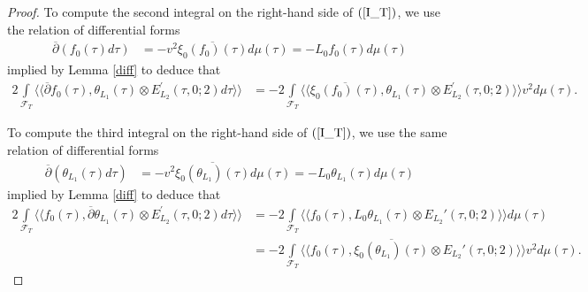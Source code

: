 \documentclass{amsart}
\theoremstyle{definition}
\begin{document}
\begin{proof}
To compute the second integral on the right-hand side of $(\ref{I_T})$, we use the relation of differential forms 
\begin{align*} \overline{\partial}(f_0(\tau) d \tau) 
&= - v^2 \overline{\xi_0(f_0)(\tau)} d \mu(\tau) = -L_0 f_0(\tau) d \mu (\tau) \end{align*}
implied by Lemma \ref{diff} to deduce that 
\begin{equation}\begin{aligned}\label{I_T2} 
 2 \int\limits_{\mathcal{F}_T} \langle \langle \overline{\partial} f_0(\tau), \theta_{L_1}(\tau) \otimes E_{L_2}^{\prime}(\tau, 0; 2) d \tau \rangle \rangle
 &= -2 \int\limits_{\mathcal{F}_T} \langle \langle \overline{\xi_0(f_0)(\tau)}, 
 \theta_{L_1}(\tau) \otimes E_{L_2}^{\prime}(\tau, 0; 2) \rangle \rangle v^2 d \mu(\tau). \end{aligned}\end{equation}

To compute the third integral on the right-hand side of $(\ref{I_T})$, we use the same relation of differential forms 
\begin{align*} \overline{\partial}(\theta_{L_1}(\tau) d \tau) &= - v^2 \overline{\xi_0(\theta_{L_1})(\tau)} d \mu(\tau) = -L_0 \theta_{L_1}(\tau) d \mu (\tau) \end{align*}
implied by Lemma \ref{diff} to deduce that 
\begin{align*} 2 \int\limits_{\mathcal{F}_T} \langle \langle  f_0(\tau),  \overline{\partial} \theta_{L_1}(\tau) \otimes E_{L_2}^{\prime}(\tau, 0; 2) d \tau \rangle \rangle &=
-2 \int\limits_{\mathcal{F}_T} \langle \langle f_0(\tau), L_0 \theta_{L_1}(\tau) \otimes E_{L_2}'(\tau, 0; 2) \rangle \rangle d \mu(\tau) \\
&= -2 \int\limits_{\mathcal{F}_T} \langle \langle f_0(\tau), \overline{\xi_0(\theta_{L_1})(\tau)} \otimes E_{L_2}'(\tau, 0; 2) \rangle \rangle v^2 d \mu(\tau). \end{align*}


\end{proof}
\end{document}
